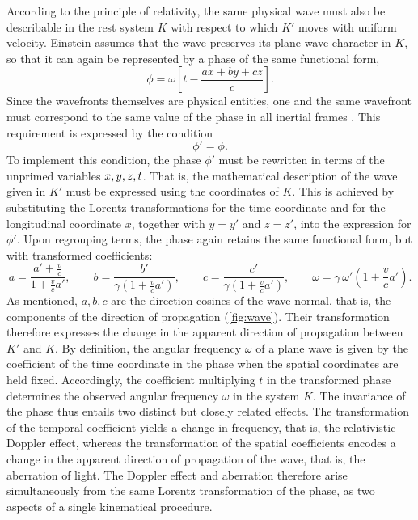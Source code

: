 \documentclass[pdflatex]{sn-jnl}
\begin{document}
According to the principle of relativity, the same physical wave must also be describable in the rest system $K$ with respect to which $K'$ moves with uniform velocity. Einstein assumes that the wave preserves its plane-wave character in $K$, so that it can again be represented by a phase of the same functional form,
\begin{equation*}
\phi=\omega\!\left[t-\frac{a x+b y+c z}{c}\right].
\end{equation*}
Since the wavefronts themselves are physical entities, one and the same wavefront must correspond to the same value of the phase in all inertial frames \citep[911]{Einstein1905}. This requirement is expressed by the condition
\begin{equation*}
\phi'=\phi.
\end{equation*}
%
To implement this condition, the phase $\phi'$ must be rewritten in terms of the unprimed variables $x,y,z,t$. That is, the mathematical description of the wave given in $K'$ must be expressed using the coordinates of $K$. This is achieved by substituting the Lorentz transformations for the time coordinate and for the longitudinal coordinate $x$, together with $y=y'$ and $z=z'$, into the expression for $\phi'$. Upon regrouping terms, the phase again retains the same functional form, but with transformed coefficients:
\begin{equation*}
a=\frac{a'+\frac{v}{c}}{1+\frac{v}{c}a'},
\qquad
b=\frac{b'}{\gamma\!\left(1+\frac{v}{c}a'\right)},
\qquad
c=\frac{c'}{\gamma\!\left(1+\frac{v}{c}a'\right)},
\qquad
\omega=\gamma\,\omega'\!\left(1+\frac{v}{c}a'\right).
\end{equation*}
%
As mentioned, $a,b,c$ are the direction cosines of the wave normal, that is, the components of the direction of propagation (\cref{fig:wave}). Their transformation therefore expresses the change in the apparent direction of propagation between $K'$ and $K$. By definition, the angular frequency $\omega$ of a plane wave is given by the coefficient of the time coordinate in the phase when the spatial coordinates are held fixed. Accordingly, the coefficient multiplying $t$ in the transformed phase determines the observed angular frequency $\omega$ in the system $K$. The invariance of the phase thus entails two distinct but closely related effects. The transformation of the temporal coefficient yields a change in frequency, that is, the relativistic Doppler effect, whereas the transformation of the spatial coefficients encodes a change in the apparent direction of propagation of the wave, that is, the aberration of light. The Doppler effect and aberration therefore arise simultaneously from the same Lorentz transformation of the phase, as two aspects of a single kinematical procedure.
\end{document}
